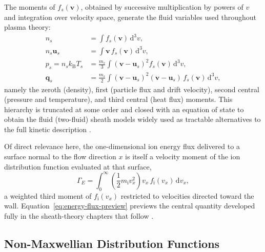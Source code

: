The moments of $f_{s}(\mathbf{v})$, obtained by successive multiplication by powers of $v$ and integration over velocity space, generate the fluid variables used throughout plasma theory:
\begin{align}
n_{s} &= \int f_{s}(\mathbf{v})\, \mathrm{d}^{3}v, \label{ch02-eq:moment0}\\
n_{s}\mathbf{u}_{s} &= \int \mathbf{v}\, f_{s}(\mathbf{v})\, \mathrm{d}^{3}v, \label{ch02-eq:moment1}\\
p_{s} = n_{s} k_{\mathrm{B}} T_{s} &= \frac{m_{s}}{3}\int (\mathbf{v}-\mathbf{u}_{s})^{2} f_{s}(\mathbf{v})\, \mathrm{d}^{3}v, \label{ch02-eq:moment2}\\
\mathbf{q}_{s} &= \frac{m_{s}}{2}\int (\mathbf{v}-\mathbf{u}_{s})^{2} (\mathbf{v}-\mathbf{u}_{s})\, f_{s}(\mathbf{v})\, \mathrm{d}^{3}v, \label{eq:moment3}
\end{align}
namely the zeroth (density), first (particle flux and drift velocity), second central (pressure and temperature), and third central (heat flux) moments. This hierarchy is truncated at some order and closed with an equation of state to obtain the fluid (two-fluid) sheath models widely used as tractable alternatives to the full kinetic description \cite{ref0023}.

Of direct relevance here, the one-dimensional ion energy flux delivered to a surface normal to the flow direction $x$ is itself a velocity moment of the ion distribution function evaluated at that surface,
\begin{equation}
\Gamma_{E} = \int_{0}^{\infty} \left(\frac{1}{2} m_{\mathrm{i}} v_{x}^{2}\right) v_{x}\, f_{\mathrm{i}}(v_{x})\, \mathrm{d}v_{x},
\label{eq:energy-flux-preview}
\end{equation}
a weighted third moment of $f_{\mathrm{i}}(v_{x})$ restricted to velocities directed toward the wall. Equation~\eqref{eq:energy-flux-preview} previews the central quantity developed fully in the sheath-theory chapters that follow \cite{ref0672}.

\subsection{Non-Maxwellian Distribution Functions}

